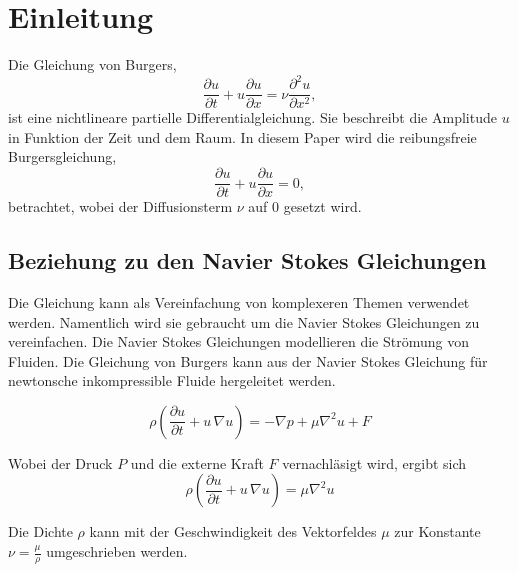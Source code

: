 %
%
\section{Einleitung \label{burgers:section:einleitung}}
	
	Die Gleichung von Burgers,
	\begin{equation}
		  \frac {\partial u}{\partial t}+u{\frac {\partial u}{\partial x}}=\nu {\frac {\partial ^{2}u}{\partial x^{2}}},
		  \label{burgers:eq_burgers}
	\end{equation}
	ist eine nichtlineare partielle Differentialgleichung.
	Sie beschreibt die Amplitude $u$ in Funktion der Zeit und dem Raum.
	In diesem Paper wird die reibungsfreie Burgersgleichung, 
	\begin{equation}
		\frac {\partial u}{\partial t}+u{\frac {\partial u}{\partial x}}=0,
		\label{burgers:eq_invisid_burgers}
	\end{equation}
	betrachtet, wobei der Diffusionsterm $\nu$ auf 0 gesetzt wird.
	
	\subsection{Beziehung zu den Navier Stokes Gleichungen}
		Die Gleichung kann als Vereinfachung von komplexeren Themen verwendet werden.
		Namentlich wird sie gebraucht um die Navier Stokes Gleichungen zu vereinfachen.
		Die Navier Stokes Gleichungen modellieren die Str\"omung von Fluiden.
		Die Gleichung von Burgers kann aus der Navier Stokes Gleichung f\"ur newtonsche inkompressible Fluide hergeleitet werden. \cite{burgers:navier}
		
		
		\begin{equation}
			\rho \left(\frac{\partial u}{\partial t} + u \, \nabla u \right) = -\nabla p + \mu \nabla^2 u + F 	
			\label{burgers:eq_navier}
		\end{equation}
		
		Wobei der Druck $P$ und die externe Kraft $F$ vernachl\"asigt wird, ergibt sich
		\begin{equation}
			\rho \left(\frac{\partial u}{\partial t} + u \, \nabla u \right) = \mu \nabla^2 u
			 \label{burgers:eq_navier2}
		\end{equation}
		
		Die Dichte $\rho$ kann mit der Geschwindigkeit des Vektorfeldes $\mu$ zur Konstante $\nu = \frac{\mu}{\rho}$ umgeschrieben werden.
		
